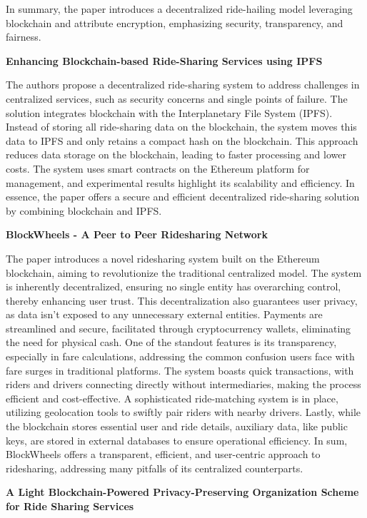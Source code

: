 In summary, the paper introduces a decentralized ride-hailing model leveraging blockchain and attribute encryption, emphasizing security, transparency, and fairness.


\textbf{Enhancing Blockchain-based Ride-Sharing Services using IPFS}

The authors propose a decentralized ride-sharing system to address challenges in centralized services, such as security concerns and single points of failure. The solution integrates blockchain with the Interplanetary File System (IPFS). Instead of storing all ride-sharing data on the blockchain, the system moves this data to IPFS and only retains a compact hash on the blockchain. This approach reduces data storage on the blockchain, leading to faster processing and lower costs. The system uses smart contracts on the Ethereum platform for management, and experimental results highlight its scalability and efficiency. In essence, the paper offers a secure and efficient decentralized ride-sharing solution by combining blockchain and IPFS.

\textbf{BlockWheels - A Peer to Peer Ridesharing Network}

The paper introduces a novel ridesharing system built on the Ethereum blockchain, aiming to revolutionize the traditional centralized model. The system is inherently decentralized, ensuring no single entity has overarching control, thereby enhancing user trust. This decentralization also guarantees user privacy, as data isn't exposed to any unnecessary external entities. Payments are streamlined and secure, facilitated through cryptocurrency wallets, eliminating the need for physical cash. One of the standout features is its transparency, especially in fare calculations, addressing the common confusion users face with fare surges in traditional platforms. The system boasts quick transactions, with riders and drivers connecting directly without intermediaries, making the process efficient and cost-effective. A sophisticated ride-matching system is in place, utilizing geolocation tools to swiftly pair riders with nearby drivers. Lastly, while the blockchain stores essential user and ride details, auxiliary data, like public keys, are stored in external databases to ensure operational efficiency. In sum, BlockWheels offers a transparent, efficient, and user-centric approach to ridesharing, addressing many pitfalls of its centralized counterparts.

\textbf{A Light Blockchain-Powered Privacy-Preserving Organization Scheme for Ride Sharing Services}

